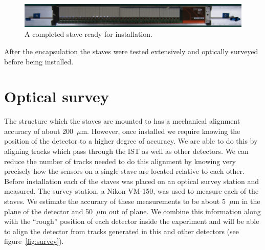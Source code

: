 \documentclass[preprint,12pt]{elsarticle}
\begin{document}
\begin{figure}[h]
\begin{center}
\includegraphics[width=6.5in, keepaspectratio=true, angle=0]{graphics/full_stave.jpg}
\caption{A completed stave ready for installation.
\label{fig:full_stave}}
\end{center}
\end{figure}
%
After the encapsulation the staves were tested extensively and optically surveyed
before being installed.

\section{Optical survey}
The structure which the staves are mounted to has a mechanical alignment
accuracy of about 200~$\mu$m. However, once installed we require knowing the
position of the detector to a higher degree of accuracy. We are able to do this
by aligning tracks which pass through the IST as well as other detectors. We
can reduce the number of tracks needed to do this alignment by knowing very
precisely how the sensors on a single stave are located relative to each other.
Before installation each of the staves was placed on an optical survey station
and measured. The survey station, a Nikon VM-150, was used to measure each of
the staves. We estimate the accuracy of these measurements to be about 5~$\mu$m in
the plane of the detector and 50~$\mu$m out of plane. We combine this information
along with the ``rough'' position of each detector inside the experiment and will
be able to align the detector from tracks generated in this and other detectors
(see figure~\ref{fig:survey}).
\end{document}
